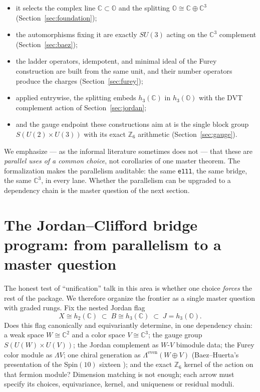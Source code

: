 \documentclass[11pt]{article}
\newcommand{\C}{\mathbb{C}}
\newcommand{\OO}{\mathbb{O}}
\newcommand{\leanname}[1]{\texttt{#1}}
\begin{document}
\begin{itemize}[leftmargin=2em]
\item it selects the complex line $\C\subset\OO$ and the splitting
  $\OO \cong \C\oplus\C^3$ (Section~\ref{sec:foundation});
\item the automorphisms fixing it are exactly $SU(3)$ acting on the
  $\C^3$ complement (Section~\ref{sec:baez});
\item the ladder operators, idempotent, and minimal ideal of the Furey
  construction are built from the same unit, and their number operators
  produce the charges (Section~\ref{sec:furey});
\item applied entrywise, the splitting embeds $h_3(\C)$ in $h_3(\OO)$
  with the DVT complement action of Section~\ref{sec:jordan};
\item and the gauge endpoint these constructions aim at is the single
  block group $S(U(2)\times U(3))$ with its exact $\mathbb{Z}_6$
  arithmetic (Section~\ref{sec:gauge}).
\end{itemize}

We emphasize --- as the informal literature sometimes does not --- that
these are \emph{parallel uses of a common choice}, not corollaries of one
master theorem.  The formalization makes the parallelism auditable: the
same \leanname{e111}, the same bridge, the same $\C^3$, in every lane.
Whether the parallelism can be upgraded to a dependency chain is the
master question of the next section.

\section{The Jordan--Clifford bridge program: from parallelism to a
master question}
\label{sec:jcbridge}

The honest test of ``unification'' talk in this area is whether one
choice \emph{forces} the rest of the package.  We therefore organize the
frontier as a single master question with graded rungs.  Fix the nested
Jordan flag
\[
X \cong h_2(\C) \;\subset\; B \cong h_3(\C) \;\subset\; J = h_3(\OO).
\]
Does this flag canonically and equivariantly determine, in one dependency
chain: a weak space $W\cong\C^2$ and a color space $V\cong\C^3$; the
gauge group $S(U(W)\times U(V))$; the Jordan complement as
$W$-$V$ bimodule data; the Furey color module as $\Lambda V$; one chiral
generation as $\Lambda^{\mathrm{even}}(W\oplus V)$ (Baez--Huerta's
presentation of the $\mathrm{Spin}(10)$ sixteen \cite{BaezHuerta2009});
and the exact $\mathbb{Z}_6$ kernel of the action on that fermion
module?  Dimension matching is not enough; each arrow must specify its
choices, equivariance, kernel, and uniqueness or residual moduli.
\end{document}
